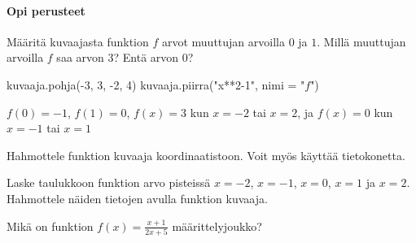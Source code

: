 \begin{tehtavasivu}

\paragraph*{Opi perusteet}
\begin{tehtava}
Määritä kuvaajasta funktion \(f\) arvot muuttujan arvoilla $0$ ja $1$. Millä muuttujan arvoilla \(f\) saa arvon \(3\)? Entä arvon \(0\)?
\begin{kuva}
    kuvaaja.pohja(-3, 3, -2, 4)
    kuvaaja.piirra("x**2-1", nimi = "$f$")
\end{kuva}
\begin{vastaus}
 $f(0)=-1$, $f(1)=0$, $f(x)=3$ kun $x=-2$ tai $x=2$, ja $f(x)=0$ kun $x=-1$ tai $x=1$
\end{vastaus}
\end{tehtava}


\begin{tehtava}
Hahmottele funktion kuvaaja koordinaatistoon. Voit myös käyttää tietokonetta.
\begin{alakohdat}
\end{alakohdat}

\end{tehtava}

\begin{tehtava}
  Laske taulukkoon funktion arvo pisteissä $x=-2$, $x=-1$, $x=0$, $x=1$ ja $x=2$. Hahmottele näiden tietojen avulla funktion kuvaaja.
  \begin{alakohdat}
  \end{alakohdat}

  \begin{vastaus}
    \begin{alakohdat}
    \end{alakohdat}
  \end{vastaus}
\end{tehtava}

\begin{tehtava} %
  Mikä on funktion $f(x)=\frac{x+1}{2x+5}$ määrittelyjoukko?


\end{tehtava}
\end{tehtavasivu}
